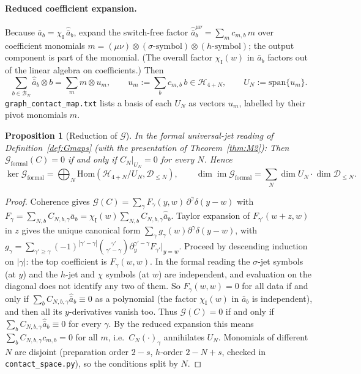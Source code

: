 \documentclass{article}
\newtheorem{proposition}{Proposition}
\theoremstyle{remark}
\newcommand{\chiI}{\chi_{\mathrm I}}
\begin{document}
\paragraph{Reduced coefficient expansion.}
Because $\bar a_b=\chiI\,\hat{\bar a}_b$, expand the switch-free factor $\hat{\bar a}_b^{\mu\nu}=\sum_m c_{m,b}\,m$ over coefficient monomials $m=(\mu\nu)\otimes(\sigma\text{-symbol})\otimes(h\text{-symbol})$; the output component is part of the monomial.
(The overall factor $\chiI(w)$ in $\bar a_b$ factors out of the linear algebra on coefficients.)
Then
\[
\sum_{b\in\mathcal B_N}\hat{\bar a}_b\otimes b=\sum_m m\otimes u_m,\qquad u_m:=\sum_bc_{m,b}\,b\in\mathcal H_{4+N},\qquad U_N:=\mathrm{span}\{u_m\}.
\]
\texttt{graph\_contact\_map.txt} lists a basis of each $U_N$ as vectors $u_m$, labelled by their pivot monomials $m$.

\begin{proposition}[Reduction of $\mathcal G$]
\label{prop:Gsplit}
In the formal universal-jet reading of Definition~\ref{def:Gmaps} (with the presentation of Theorem~\ref{thm:M2}):
Then $\mathcal G_{\mathrm{formal}}(C)=0$ if and only if $C_N|_{U_N}=0$ for every $N$.
Hence
\[
\ker\mathcal G_{\mathrm{formal}}=\bigoplus_N\mathrm{Hom}(\mathcal H_{4+N}/U_N,\mathcal D_{\le N}),\qquad
\dim\operatorname{im}\mathcal G_{\mathrm{formal}}=\sum_N\dim U_N\cdot\dim\mathcal D_{\le N}.
\]
\end{proposition}

\begin{proof}
Coherence gives $\mathcal G(C)=\sum_\gamma F_\gamma(y,w)\,\partial^\gamma\delta(y-w)$ with $F_\gamma=\sum_{N,b}C_{N,b,\gamma}\bar a_b=\chiI(w)\sum_{N,b}C_{N,b,\gamma}\hat{\bar a}_b$.
Taylor expansion of $F_{\gamma'}(w+z,w)$ in $z$ gives the unique canonical form $\sum_\gamma g_\gamma(w)\partial^\gamma\delta(y-w)$, with
$g_\gamma=\sum_{\gamma'\ge\gamma}(-1)^{|\gamma'-\gamma|}\binom{\gamma'}{\gamma'-\gamma}\partial_y^{\gamma'-\gamma}F_{\gamma'}|_{y=w}$.
Proceed by descending induction on $|\gamma|$: the top coefficient is $F_\gamma(w,w)$.
In the formal reading the $\sigma$-jet symbols (at $y$) and the $h$-jet and $\chi$ symbols (at $w$) are independent, and evaluation on the diagonal does not identify any two of them.
So $F_\gamma(w,w)=0$ for all data if and only if $\sum_bC_{N,b,\gamma}\hat{\bar a}_b\equiv0$ as a polynomial (the factor $\chiI(w)$ in $\bar a_b$ is independent), and then all its $y$-derivatives vanish too.
Thus $\mathcal G(C)=0$ if and only if $\sum_bC_{N,b,\gamma}\hat{\bar a}_b\equiv0$ for every $\gamma$.
By the reduced expansion this means $\sum_bC_{N,b,\gamma}c_{m,b}=0$ for all $m$, i.e.\ $C_N(\cdot)_\gamma$ annihilates $U_N$.
Monomials of different $N$ are disjoint (preparation order $2-s$, $h$-order $2-N+s$, checked in \texttt{contact\_space.py}), so the conditions split by $N$.
\end{proof}
\end{document}
